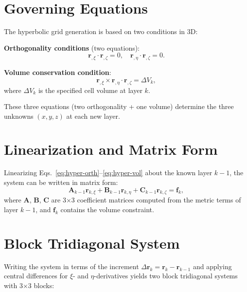 \documentclass[11pt,a4paper]{report}
\newcommand{\rvec}{\bm{r}}
\begin{document}
\section{Governing Equations}

The hyperbolic grid generation is based on two conditions in 3D:

\textbf{Orthogonality conditions} (two equations):
\begin{equation}
    \rvec_{,\xi} \cdot \rvec_{,\zeta} = 0, \quad \rvec_{,\eta} \cdot \rvec_{,\zeta} = 0.
    \label{eq:hyper-orth}
\end{equation}

\textbf{Volume conservation condition}:
\begin{equation}
    \rvec_{,\xi} \times \rvec_{,\eta} \cdot \rvec_{,\zeta} = \Delta V_k,
    \label{eq:hyper-vol}
\end{equation}
where $\Delta V_k$ is the specified cell volume at layer $k$.

These three equations (two orthogonality + one volume) determine the three unknowns $(x, y, z)$ at each new layer.

\section{Linearization and Matrix Form}

Linearizing Eqs.~\eqref{eq:hyper-orth}--\eqref{eq:hyper-vol} about the known layer $k-1$, the system can be written in matrix form:
\begin{equation}
    \bm{A}_{k-1} \rvec_{k,\xi} + \bm{B}_{k-1} \rvec_{k,\eta} + \bm{C}_{k-1} \rvec_{k,\zeta} = \bm{f}_k,
\end{equation}
where $\bm{A}$, $\bm{B}$, $\bm{C}$ are 3$\times$3 coefficient matrices computed from the metric terms of layer $k-1$, and $\bm{f}_k$ contains the volume constraint.

\section{Block Tridiagonal System}

Writing the system in terms of the increment $\Delta \rvec_k = \rvec_k - \rvec_{k-1}$ and applying central differences for $\xi$- and $\eta$-derivatives yields two block tridiagonal systems with 3$\times$3 blocks:
\end{document}
